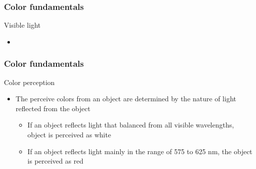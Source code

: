 \documentclass{beamer}
\begin{document}
\begin{frame}
\frametitle{Color fundamentals}
\begin{block}{Visible light}
\begin{itemize}
	\item[]
\end{itemize}
\end{block}
\end{frame}
\begin{frame}
\frametitle{Color fundamentals}
\begin{block}{Color perception}
\begin{itemize}
		\item The perceive colors from an object are determined by the nature of light reflected from the object
		\begin{itemize}
		\item If an object reflects light that balanced from all visible wavelengths, object is perceived as white
		\item If an object reflects light mainly in the range of 575 to 625 nm, the object is perceived as red  
		\end{itemize}
\end{itemize}

\end{block}
\end{frame}
\end{document}
